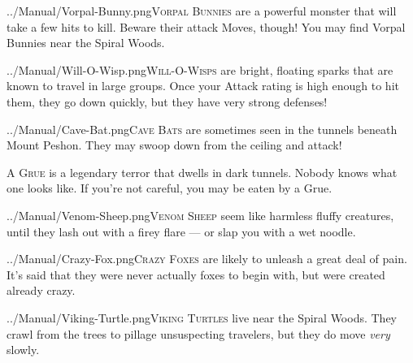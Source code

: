 \documentclass[10pt,twocolumn,openany,article]{memoir}
\begin{document}
\vspace{14pt}

\lettrine[image=true,                lines=5,               findent=3pt,
nindent=3pt]{../Manual/Vorpal-Bunny.png}{Vorpal Bunnies}  are a powerful
monster that  will take a few  hits to kill. Beware  their attack Moves,
though! You may find Vorpal Bunnies near the Spiral Woods.

\pagebreak

\lettrine[image=true,                lines=5,               findent=3pt,
nindent=3pt]{../Manual/Will-O-Wisp.png}{Will-O-Wisps}     are    bright,
floating sparks  that are  known to  travel in  large groups.  Once your
Attack rating is high enough to hit them, they go down quickly, but they
have very strong defenses!

\vspace{14pt}

\lettrine[image=true,                lines=5,               findent=3pt,
nindent=3pt]{../Manual/Cave-Bat.png}{Cave  Bats} are  sometimes seen  in
the tunnels beneath  Mount Peshon. They may swoop down  from the ceiling
and attack!

\vspace{14pt}

\textsc{A  Grue} is  a legendary  terror  that dwells  in dark  tunnels.
Nobody knows  what one  looks like.  If you're not  careful, you  may be
eaten by a Grue.

\vspace{14pt}

\lettrine[image=true,                lines=5,               findent=3pt,
nindent=3pt]{../Manual/Venom-Sheep.png}{Venom Sheep}  seem like harmless
fluffy creatures, until they lash out with a firey flare --- or slap you
with a wet noodle.

\vspace{14pt}

\lettrine[image=true,                lines=5,               findent=3pt,
nindent=3pt]{../Manual/Crazy-Fox.png}{Crazy Foxes} are likely to unleash
a great deal of  pain. It's said that they were  never actually foxes to
begin with, but were created already crazy.

\ifdefined\ATARIAGESAVE\pagebreak\else\vspace{14pt}\fi

\lettrine[image=true,                lines=5,               findent=3pt,
nindent=3pt]{../Manual/Viking-Turtle.png}{Viking Turtles}  live near the
Spiral Woods. They crawl from the trees to pillage unsuspecting
travelers, but they do move \emph{very} slowly.
\end{document}
